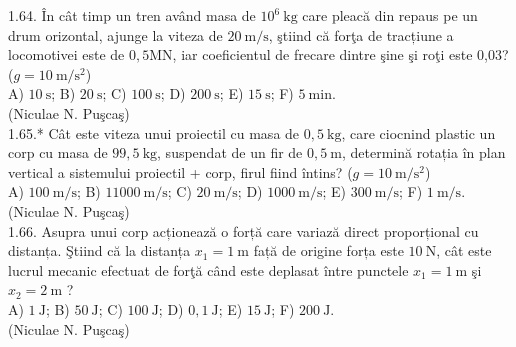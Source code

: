 \documentclass[10pt]{article}
\begin{document}
1.64. În cât timp un tren având masa de $10^{6} \mathrm{~kg}$ care pleacă din repaus pe un drum orizontal, ajunge la viteza de $20 \mathrm{~m} / \mathrm{s}$, ştiind că forţa de tracțiune a locomotivei este de $0,5 \mathrm{MN}$, iar coeficientul de frecare dintre şine şi roţi este 0,03? ($g=10 \mathrm{~m} / \mathrm{s}^{2}$)\\ A) $10 \mathrm{~s}$; B) $20 \mathrm{~s}$; C) $100 \mathrm{~s}$; D) $200 \mathrm{~s}$; E) $15 \mathrm{~s}$; F) $5 \mathrm{~min}$.\\ (Niculae N. Puşcaş)\\

1.65.* Cât este viteza unui proiectil cu masa de $0,5 \mathrm{~kg}$, care ciocnind plastic un corp cu masa de $99,5 \mathrm{~kg}$, suspendat de un fir de $0,5 \mathrm{~m}$, determină rotația în plan vertical a sistemului proiectil + corp, firul fiind întins? ($g=10 \mathrm{~m} / \mathrm{s}^{2}$)\\ A) $100 \mathrm{~m} / \mathrm{s}$; B) $11000 \mathrm{~m} / \mathrm{s}$; C) $20 \mathrm{~m} / \mathrm{s}$; D) $1000 \mathrm{~m} / \mathrm{s}$; E) $300 \mathrm{~m} / \mathrm{s}$; F) $1 \mathrm{~m} / \mathrm{s}$.\\ (Niculae N. Puşcaş)\\

1.66. Asupra unui corp acționează o forță care variază direct proporțional cu distanța. Ştiind că la distanța $x_{1}=1 \mathrm{~m}$ față de origine forța este $10 \mathrm{~N}$, cât este lucrul mecanic efectuat de forţă când este deplasat între punctele $x_{1}=1 \mathrm{~m}$ şi $x_{2}=2 \mathrm{~m}$ ?\\ A) $1 \mathrm{~J}$; B) $50 \mathrm{~J}$; C) $100 \mathrm{~J}$; D) $0,1 \mathrm{~J}$; E) $15 \mathrm{~J}$; F) $200 \mathrm{~J}$.\\ (Niculae N. Puşcaş)\\
\end{document}
